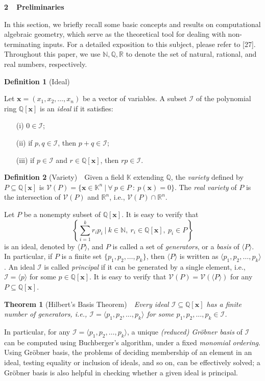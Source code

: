 \documentclass{article}
\def\dse#1{\vskip 0.6cm\noindent
        {\large\bf #1}
        \vskip 0.4cm}
\newcommand{\I}{\mathcal{I}}
\newcommand{\V}{\mathcal{V}}
\newcommand{\xx}{\mathbf{x}}
\begin{document}
\dse{2~~Preliminaries}

In this section, we briefly recall some basic concepts and results on computational algebraic geometry, which serve as the theoretical tool for dealing with non-terminating inputs. For a detailed exposition to this subject, please refer to [27]. Throughout this paper, we use $\mathbb{N}, \mathbb{Q}, \mathbb{R}$ to denote the set of natural, rational, and real numbers, respectively.

{\bf Definition 1} (Ideal)~~{Let $\xx=(x_1,x_2,\ldots,x_n)$ be a vector of variables. A subset $\I$ of the polynomial ring $\mathbb{Q}[\xx]$ is an \emph{ideal} if it satisfies:
\begin{itemize}
\item[(i)] $0 \in \I$;
\item[(ii)] if $p,q \in \I$, then $p+q \in \I$;
\item[(iii)] if $p \in \I$ and $r \in \mathbb{Q}[\xx]$, then $rp \in \I$.
\end{itemize}}

{\bf Definition 2} (Variety)~~{Given a field $\mathbb{K}$ extending $\mathbb{Q}$, the \emph{variety} defined by $P \subseteq \mathbb{Q}[\xx]$ is $\V(P)=\{\xx \in \mathbb{K}^n \ | \ \forall \ p \in P \ : \ p(\xx)=0 \}$. The \emph{real variety} of $P$ is the intersection of $\V(P)$ and $\mathbb{R}^n$, i.e., $\V(P) \cap \mathbb{R}^n$.}

Let $P$ be a nonempty subset of $\mathbb{Q}[\xx]$. It is easy to verify that
\[
\left\{\sum_{i=1}^k r_i p_i \ | \ k \in \mathbb{N}, \ r_i \in \mathbb{Q}[\xx],\ p_i \in P \right\}
\]
is an ideal, denoted by $\langle P\rangle$, and $P$ is called a set of \emph{generators}, or a \emph{basis} of $\langle P \rangle$. In particular, if $P$ is a finite set $\{p_1,p_2,\ldots,p_k\}$, then $\langle P \rangle$ is written as $\langle p_1,p_2,\ldots,p_k \rangle$. An ideal $\I$ is called \emph{principal} if it can be generated by a single element, i.e., $\I=\langle p \rangle$ for some $p\in \mathbb{Q}[\xx]$. It is easy to verify that $\V(P)=\V(\langle P \rangle)$ for any $P \subseteq \mathbb{Q}[\xx]$.

{\bf Theorem 1} (Hilbert's Basis Theorem)~~{\it Every ideal $\I \subseteq \mathbb{Q}[\xx]$ has a finite number of generators, i.e., $\I=\langle p_1,p_2,\ldots,p_k \rangle$ for some $p_1,p_2,\ldots,p_k \in \I$.}

In particular, for any $\I=\langle p_1,p_2,\ldots,p_k \rangle$, a unique \emph{(reduced) Gr\"{o}bner basis} of $\I$ can be computed using Buchberger's algorithm, under a fixed \emph{monomial ordering}. Using Gr\"{o}bner basis, the problems of deciding membership of an element in an ideal, testing equality or inclusion of ideals, and so on, can be effectively solved; a Gr\"obner basis is also helpful in checking whether a given ideal is principal.
\end{document}
